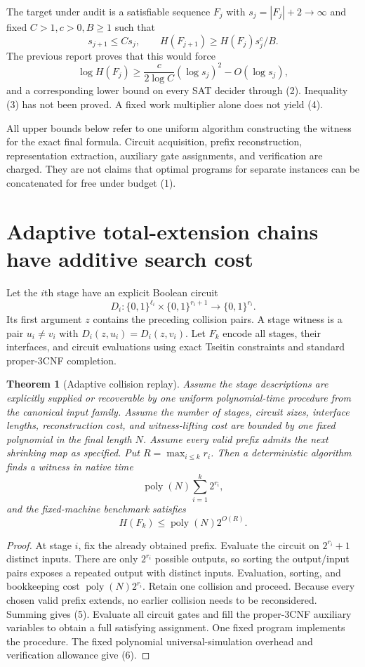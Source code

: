 \documentclass[11pt]{article}
\newtheorem{theorem}{Theorem}
\newcommand{\poly}{\operatorname{poly}}
\begin{document}
The target under audit is a satisfiable sequence $F_j$ with
$s_j=|F_j|+2\to\infty$ and fixed $C>1,c>0,B\ge1$ such that
\[
 s_{j+1}\le Cs_j,\qquad
 H(F_{j+1})\ge H(F_j)s_j^c/B.
 \tag{3}
\]
The previous report proves that this would force
\[
 \log H(F_j)\ge
 \frac{c}{2\log C}(\log s_j)^2-O(\log s_j),
 \tag{4}
\]
and a corresponding lower bound on every SAT decider through (2).
Inequality (3) has not been proved. A fixed work multiplier alone does
not yield (4).

All upper bounds below refer to one uniform algorithm constructing the
witness for the exact final formula. Circuit acquisition, prefix
reconstruction, representation extraction, auxiliary gate assignments,
and verification are charged. They are not claims that optimal programs
for separate instances can be concatenated for free under budget (1).

\section{Adaptive total-extension chains have additive search cost}

Let the $i$th stage have an explicit Boolean circuit
\[
 D_i:\{0,1\}^{\ell_i}\times\{0,1\}^{r_i+1}\longrightarrow
       \{0,1\}^{r_i}.
\]
Its first argument $z$ contains the preceding collision pairs.
A stage witness is a pair $u_i\ne v_i$ with
$D_i(z,u_i)=D_i(z,v_i)$. Let $F_k$ encode all stages, their interfaces,
and circuit evaluations using exact Tseitin constraints and standard
proper-3CNF completion.

\begin{theorem}[Adaptive collision replay]\label{thm:collision}
Assume the stage descriptions are explicitly supplied or recoverable by
one uniform polynomial-time procedure from the canonical input family.
Assume the number of stages, circuit sizes, interface lengths, reconstruction
cost, and witness-lifting cost are bounded by one fixed polynomial in the
final length $N$. Assume \emph{every valid prefix} admits the next shrinking
map as specified. Put $R=\max_{i\le k}r_i$. Then a deterministic algorithm
finds a witness in native time
\[
 \poly(N)\sum_{i=1}^k 2^{r_i},
 \tag{5}
\]
and the fixed-machine benchmark satisfies
\[
 H(F_k)\le \poly(N)2^{O(R)}.
 \tag{6}
\]
\end{theorem}

\begin{proof}
At stage $i$, fix the already obtained prefix. Evaluate the circuit on
$2^{r_i}+1$ distinct inputs. There are only $2^{r_i}$ possible outputs,
so sorting the output/input pairs exposes a repeated output with distinct
inputs. Evaluation, sorting, and bookkeeping cost
$\poly(N)2^{r_i}$. Retain one collision and proceed.
Because every chosen valid prefix extends, no earlier collision needs
to be reconsidered. Summing gives (5). Evaluate all circuit gates and
fill the proper-3CNF auxiliary variables to obtain a full satisfying
assignment. One fixed program implements the procedure. The fixed
polynomial universal-simulation overhead and verification allowance
give (6).
\end{proof}
\end{document}
